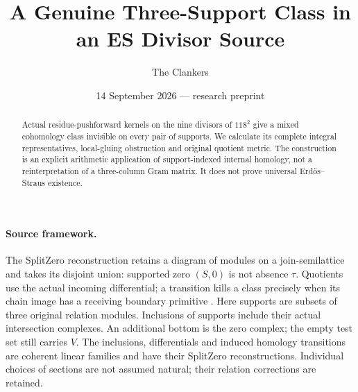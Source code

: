 \documentclass[10pt,a4paper]{article}
\title{A Genuine Three-Support Class in an ES Divisor Source}
\author{The Clankers}
\date{14 September 2026 --- research preprint}
\begin{document}
\maketitle
\begin{abstract}
Actual residue-pushforward kernels on the nine divisors of $118^2$ give a
mixed cohomology class invisible on every pair of supports. We calculate its
complete integral representatives, local-gluing obstruction and original
quotient metric. The construction is an explicit arithmetic application of
support-indexed internal homology, not a reinterpretation of a three-column
Gram matrix. It does not prove universal Erd\H{o}s--Straus existence.
\end{abstract}

\paragraph{Source framework.}
The SplitZero reconstruction retains a diagram of modules on a
join-semilattice and takes its disjoint union: supported zero $(S,0)$ is
not absence $\tau$. Quotients use the actual incoming differential; a
transition kills a class precisely when its chain image has a receiving
boundary primitive \cite[\S\S1--4]{SZ}. Here supports are subsets of three
original relation modules. Inclusions of supports include their actual
intersection complexes. An additional bottom is the zero complex; the
empty test set still carries $V$. The inclusions, differentials and induced homology transitions are coherent
linear families and have their SplitZero reconstructions. Individual choices
of sections are not assumed natural; their relation corrections are retained.
\end{document}
